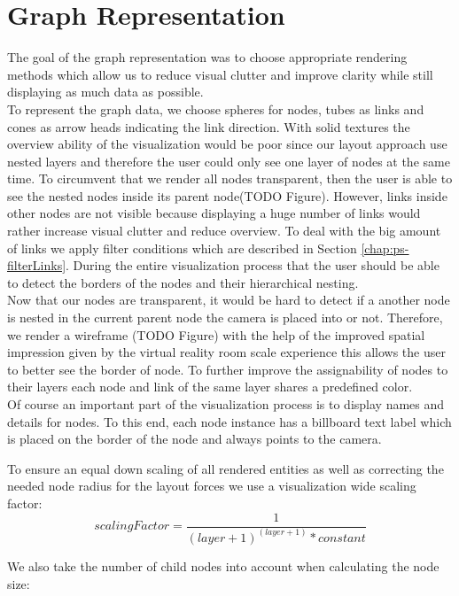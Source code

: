 \section{Graph Representation}
The goal of the graph representation was to choose appropriate rendering methods which allow us to reduce visual clutter and improve clarity while still displaying as much data as possible.\\
To represent the graph data, we choose spheres for nodes, tubes as links and cones as arrow heads indicating the link direction.
With solid textures the overview ability of the visualization would be poor since our layout approach use nested layers and therefore the user could only see one layer of nodes at the same time. To circumvent that we render all nodes transparent, then the user is able to see the nested nodes inside its parent node(TODO Figure). 
However, links inside other nodes are not visible because displaying a huge number of links would rather increase visual clutter and reduce overview. To deal with the big amount of links we apply filter conditions which are described in Section \ref{chap:ps-filterLinks}.
During the entire visualization process that the user should be able to detect the borders of the nodes and their hierarchical nesting.\\ Now that our nodes are transparent, it would be hard to detect if a another node is nested in the current parent node the camera is placed into or not. Therefore, we render a wireframe (TODO Figure) with the help of the improved spatial impression given by the virtual reality room scale experience this allows the user to better see the border of node. To further improve the assignability of nodes to their layers each node and link of the same layer shares a predefined color.\\
Of course an important part of the visualization process is to display names and details for nodes. To this end, each node instance has a billboard text label which is placed on the border of the node and always points to the camera.

To ensure an equal down scaling of all rendered entities as well as correcting the needed node radius for the layout forces we use a visualization wide scaling factor:
\begin{equation}
    scalingFactor = \frac{1}{(layer+1)^{(layer+1)} * constant}
\end{equation}

We also take the number of child nodes into account when calculating the node size: 

